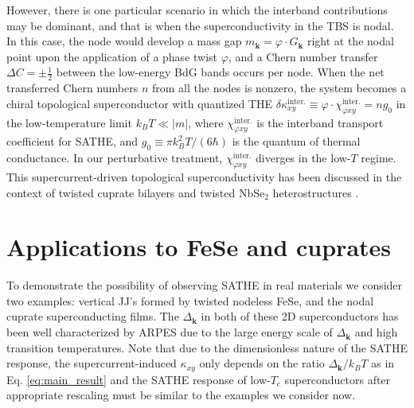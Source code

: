 However, there is one particular scenario in which the interband contributions may be dominant, and that is when the superconductivity in the TBS is nodal. In this case, the node would develop a mass gap $m_{\bm k}=\varphi\cdot G_{\bm{k}}$ right at the nodal point upon the application of a phase twist $\varphi$, and a Chern number transfer $\Delta C=\pm \frac{1}{2}$ between the low-energy BdG bands occurs per node. When the net transferred Chern numbers $n$ from all the nodes is nonzero, the system becomes a chiral topological superconductor with quantized THE $\delta\kappa_{xy}^{\text{inter.}}\equiv\varphi\cdot\chi_{\varphi xy}^{\text{inter.}}=ng_0$ in the low-temperature limit $k_BT\ll |m|$, where $\chi_{\varphi xy}^{\text{inter.}}$ is the interband transport coefficient for SATHE, and $g_0\equiv\pi k_B^2T/(6\hbar)$ is the quantum of thermal conductance. In our perturbative treatment, $\chi_{\varphi xy}^{\text{inter.}}$ diverges in the low-$T$ regime. This supercurrent-driven topological superconductivity has been discussed in the context of twisted cuprate bilayers \cite{volkov2023current,volkov2023magic,can2021high,song2022doping} and twisted NbSe$_2$ heterostructures \cite{hu2022engineering}.


\section{Applications to FeSe and cuprates}
To demonstrate the possibility of observing SATHE in real materials we consider two examples: vertical JJ's formed by twisted nodeless FeSe, and the nodal cuprate superconducting films. The $\varDelta_{\bm{k}}$ in both of these 2D superconductors has been well characterized by ARPES due to the large energy scale of $\varDelta_{\bm{k}}$ and high transition temperatures. Note that due to the dimensionless nature of the SATHE response, the supercurrent-induced $\kappa_{xy}$ only depends on the ratio $\varDelta_{\bm{k}}/k_B T$ as in Eq. \eqref{eq:main_result} and the SATHE response of low-$T_c$ superconductors after appropriate rescaling must be similar to the examples we consider now.

